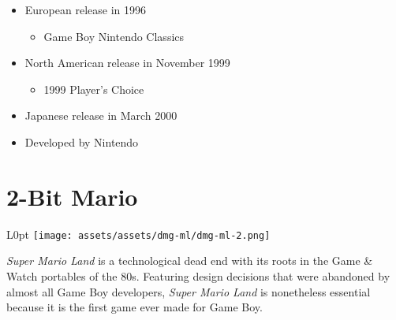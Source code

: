 \documentclass{book}
\begin{document}
\begin{itemize} [nosep]
\item European release in 1996
\begin{itemize} [nosep]\item Game Boy Nintendo Classics\end{itemize}\noindent






\item North American release in November 1999
\begin{itemize} [nosep]\item 1999 Player’s Choice\end{itemize}\noindent






\item Japanese release in March 2000





































\item Developed by Nintendo

\end{itemize}\noindent

\newpage\FloatBarrier\needspace{10mm}\section*{2-Bit Mario}\nopagebreak[4]
\begin{wrapfigure}{L}{0pt} \texttt{[image: assets/assets/dmg-ml/dmg-ml-2.png]}\end{wrapfigure}
\emph{Super Mario Land} is a technological dead end with its roots in the Game \& Watch portables of the 80s. Featuring design decisions that were abandoned by almost all Game Boy developers, \emph{Super Mario Land} is nonetheless essential because it is the first game ever made for Game Boy.
\end{document}
